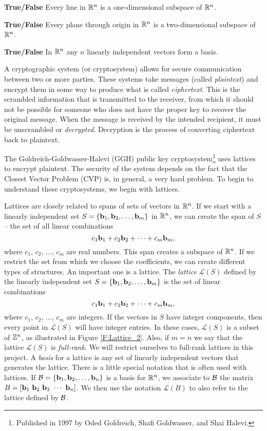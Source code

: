 \item \textbf{True/False} Every line in $\mathbb{R}^n$ is a one-dimensional subspace of $\mathbb{R}^n$.

\item \textbf{True/False} Every plane through origin in $\mathbb{R}^n$ is a two-dimensional subspace of $\mathbb{R}^n$.

\item \textbf{True/False} In $\mathbb{R}^n$ any $n$ linearly independent vectors form a basis.

\ea

\ee


A cryptographic system (or cryptosystem) allows for secure communication between two or more parties. These systems take messages (called \emph{plaintext}) and encrypt them in some way to produce what is called \emph{ciphertext}. This is the scrambled information that is transmitted to the receiver, from which it should not be possible for someone who does not have the proper key to recover the original message. When the message is received by the intended recipient, it must be unscrambled or \emph{decrypted}. Decryption is the process of converting ciphertext back to plaintext. 

The Goldreich-Goldwasser-Halevi (GGH) public key cryptosystem\footnote{Published in 1997 by Oded Goldreich, Shafi Goldwasser, and Shai Halevi.} uses lattices to encrypt plaintext. The security of the system depends on the fact that the Closest Vector Problem (CVP) is, in general, a very hard problem.  To begin to understand these cryptosystems, we begin with lattices. 

Lattices are closely related to spans of sets of vectors in $\mathbb{R}^n$. If we start with a linearly independent set $S = \{\mathbf{b}_1, \mathbf{b}_2, \ldots, \mathbf{b}_m\}$ in $\mathbb{R}^n$, we can create the span of $S$ -- the set of all linear combinations 
\[c_1 \mathbf{b}_1 + c_2 \mathbf{b}_2 + \cdots + c_m \mathbf{b}_m,\]
where $c_1$, $c_2$, $\ldots$, $c_m$ are real numbers. This span creates a subspace of $\mathbb{R}^n$. If we restrict the set from which we choose the coefficients, we can create different types of structures. An important one is a lattice. The \emph{lattice} $\mathcal{L}(S)$ defined by the linearly independent set $S = \{\mathbf{b}_1, \mathbf{b}_2, \ldots, \mathbf{b}_m\}$ is the set of linear combinations
\[c_1 \mathbf{b}_1 + c_2 \mathbf{b}_2 + \cdots + c_m \mathbf{b}_m,\]
where $c_1$, $c_2$, $\ldots$, $c_m$ are integers. If the vectors in $S$ have integer components, then every point in $\mathcal{L}(S)$ will have integer entries. In these cases, $\mathcal{L}(S)$ is a subset of $\mathbb{Z}^n$, as illustrated in Figure \ref{F:Lattice_2}. Also, if $m = n$ we say that the lattice $\mathcal{L}(S)$ is \emph{full-rank}. We will restrict ourselves to full-rank lattices in this project. A \emph{basis} for a lattice is any set of linearly independent vectors that generates the lattice. There is a little special notation that is often used with lattices. If $\mathcal{B} =  \{\mathbf{b}_1, \mathbf{b}_2, \ldots, \mathbf{b}_n\}$ is a basis for $\mathbb{R}^n$, we associate to $\mathcal{B}$ the matrix $B = [\mathbf{b}_1 \ \mathbf{b}_2 \ \mathbf{b}_3 \ \cdots \ \mathbf{b}_n]$. We then use the notation $\mathcal{L}(B)$ to also refer to the lattice defined by $\mathcal{B}$. 

